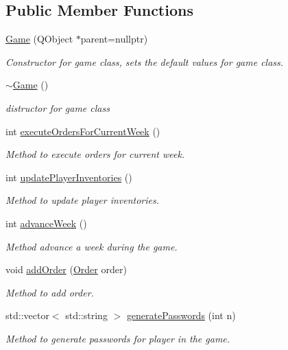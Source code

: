 \subsection*{Public Member Functions}
\begin{DoxyCompactItemize}
\item 
\hyperlink{class_game_a3b4c8aab575024b6f3e2d648c6e17418}{Game} (Q\+Object $\ast$parent=nullptr)
\begin{DoxyCompactList}\small\item\em Constructor for game class, sets the default values for game class. \end{DoxyCompactList}\item 
\hyperlink{class_game_ae3d112ca6e0e55150d2fdbc704474530}{$\sim$\+Game} ()
\begin{DoxyCompactList}\small\item\em distructor for game class \end{DoxyCompactList}\item 
int \hyperlink{class_game_aa48501c52deee3c167334844e72a16b9}{execute\+Orders\+For\+Current\+Week} ()
\begin{DoxyCompactList}\small\item\em Method to execute orders for current week. \end{DoxyCompactList}\item 
int \hyperlink{class_game_a87b96a8975a2db552b1f556f488211c3}{update\+Player\+Inventories} ()
\begin{DoxyCompactList}\small\item\em Method to update player inventories. \end{DoxyCompactList}\item 
int \hyperlink{class_game_a8471ea91ed18fc2d289eb23747d11d39}{advance\+Week} ()
\begin{DoxyCompactList}\small\item\em Method advance a week during the game. \end{DoxyCompactList}\item 
void \hyperlink{class_game_a0e6b1f8c9d598c7eb860d04c218fa546}{add\+Order} (\hyperlink{class_order}{Order} order)
\begin{DoxyCompactList}\small\item\em Method to add order. \end{DoxyCompactList}\item 
std\+::vector$<$ std\+::string $>$ \hyperlink{class_game_aa083541e01feec6694497e8c6eb5ffe8}{generate\+Passwords} (int n)
\begin{DoxyCompactList}\small\item\em Method to generate passwords for player in the game. \end{DoxyCompactList}\item 

\end{DoxyCompactItemize}
